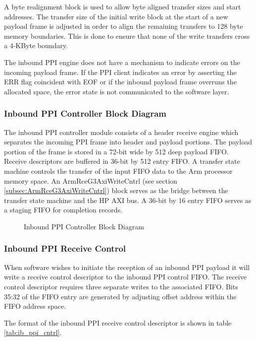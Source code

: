\documentclass[11pt]{article}
\begin{document}
A byte realignment block is used to allow byte aligned transfer sizes and start addresses. The transfer size of the initial write block at the start 
of a new payload frame is adjusted in order to align the remaining transfers to 128 byte memory boundaries. This is done to ensure that none of the write 
transfers cross a 4-KByte boundary.

The inbound PPI engine does not have a mechanism to indicate errors on the incoming payload frame. If the PPI client indicates an error by asserting the ERR flag 
coincident with EOF or if the inbound payload frame overruns the allocated space, the error state is not communicated to the software layer.

\subsubsection{Inbound PPI Controller Block Diagram}

The inbound PPI controller module consists of a header receive engine which separates the incoming PPI frame into header and payload portions. The payload
portion of the frame is stored in a 72-bit wide by 512 deep payload FIFO. Receive descriptors are buffered in 36-bit by 512 entry FIFO. A transfer 
state machine controls the transfer of the input FIFO data to the Arm processor memory space. An ArmRceG3AxiWriteCntrl (see section \ref{subsec:ArmRceG3AxiWriteCntrl})
block serves as the bridge between the transfer state machine and the HP AXI bus. A 36-bit by 16 entry FIFO serves as a staging FIFO for completion records. 

\begin{figure}[H]
   \centering
   \caption{Inbound PPI Controller Block Diagram}
   \label{fig:ib_ppi_block}
\end{figure}

\subsubsection{Inbound PPI Receive Control}

When software wishes to initiate the reception of an inbound PPI payload it will write a receive control
descriptor to the inbound PPI control FIFO. The receive control descriptor requires three separate 
writes to the associated FIFO. Bits 35:32 of the FIFO entry are generated by adjusting offset address 
within the FIFO address space.

The format of the inbound PPI receive control descriptor is shown in table \ref{tab:ib_ppi_cntrl}.
\end{document}
